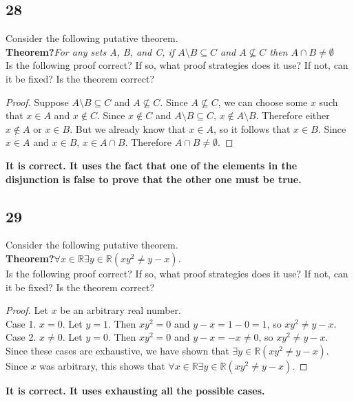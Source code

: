 \documentclass{article}
\begin{document}
\subsection{28}
Consider the following putative theorem.
$ $\\
\textbf{Theorem?}\textit{For any sets A, B, and C, if $A \setminus B \subseteq C$ and $A \nsubseteq C$ then $A \cap B \neq \emptyset$}
$ $ \\
Is the following proof correct? If so, what proof strategies does it use? If not, can it be fixed? Is the theorem correct?
\begin{proof}
Suppose $A \setminus B \subseteq C$ and $A \nsubseteq C$. Since $A \nsubseteq C$, we can choose some $x$ such that $x \in A$ and $x \notin C$. Since $x \notin C$ and $A \setminus B \subseteq C$, $x \notin A \setminus B$. Therefore either $x \notin A$ or $x \in B$. But we already know that $x \in A$, so it follows that $x \in B$. Since $x \in A$ and $x \in B$, $x \in A \cap B$. Therefore $A \cap B \neq \emptyset$.
\end{proof}
\textbf{It is correct. It uses the fact that one of the elements in the disjunction is false to prove that the other one must be true.}
\subsection{29}
Consider the following putative theorem.
$ $\\
\textbf{Theorem?}\textit{$\forall x \in \mathbb{R} \exists y \in  \mathbb{R} (xy^2 \neq y-x)$.}
$ $ \\
Is the following proof correct? If so, what proof strategies does it use? If not, can it be fixed? Is the theorem correct?

\begin{proof}
Let $x$ be an arbitrary real number. $ $\\
Case 1. $x = 0$. Let $y=1$. Then $xy^2 =0$ and $y-x=1-0=1$, so $xy^2 \neq y-x$. $ $\\
Case 2. $x \neq 0$. Let $y=0$. Then $xy^2 = 0$ and $y-x=-x \neq 0$, so $xy^2 \neq y-x$.
$ $\\
Since these cases are exhaustive, we have shown that $\exists y \in \mathbb{R}(xy^2 \neq y-x)$. Since $x$ was arbitrary, this shows that $\forall x \in \mathbb{R} \exists y \in  \mathbb{R} (xy^2 \neq y-x)$.
\end{proof}
\textbf{It is correct. It uses exhausting all the possible cases.}
\newpage
\end{document}
